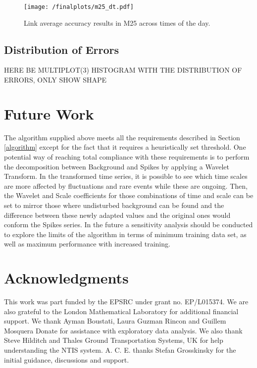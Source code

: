 \documentclass[conference]{IEEEtran}
\begin{document}
\begin{figure}[htbp]
	\centering
	\texttt{[image: /finalplots/m25\_dt.pdf]}
	\caption{Link average accuracy results in M25 across times of the day.}
	\label{fig:m25daytime}
\end{figure}
\subsection{Distribution of Errors}
HERE BE MULTIPLOT(3) HISTOGRAM WITH THE DISTRIBUTION OF ERRORS, ONLY SHOW SHAPE
\section{Future Work}
The algorithm supplied above meets all the requirements described in Section \ref{algorithm} except for the fact that it requires a heuristically set threshold. 
One potential way of reaching total compliance with these requirements is to perform the decomposition between Background and Spikes by applying a Wavelet Transform. 
In the transformed time series, it is possible to see which time scales are more affected by fluctuations and rare events while these are ongoing. 
Then, the Wavelet and Scale coefficients for those combinations of time and scale can be set to mirror those where undisturbed background can be found and the difference between these newly adapted values and the original ones would conform the Spikes series.
In the future a sensitivity analysis should be conducted to explore the limits of the algorithm in terms of minimum training data set, as well as maximum performance with increased training.
\section*{Acknowledgments}
This work was part funded by the EPSRC under grant no. EP/L015374. We are also grateful to the London Mathematical Laboratory for additional financial support. We thank Ayman Boustati, Laura Guzman Rincon and Guillem Mosquera Donate for assistance with exploratory data analysis. We also thank Steve Hilditch and Thales Ground Transportation Systems, UK for help understanding the NTIS system.  A. C. E. thanks Stefan Grosskinsky for the initial guidance, discussions and support.
\end{document}
